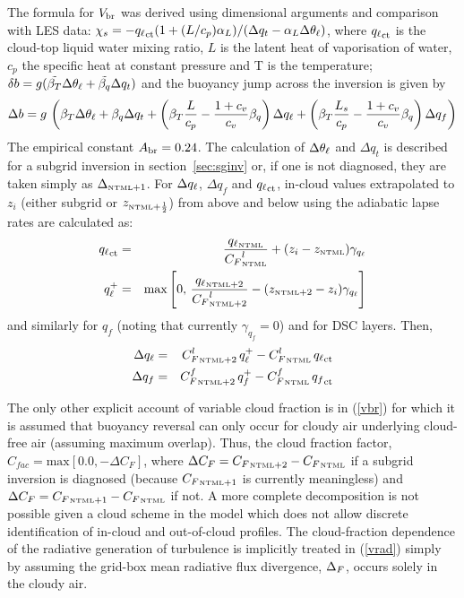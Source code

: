 \documentclass{UMDP_article}
\begin{document}
The formula for $V_{\rm br}$ was derived using dimensional arguments and
comparison with LES data: $\chi_s = -{q_{\ell}}_{\rm ct} (1+(L/c_p)\alpha_L) / (
\Delta q_t - \alpha_L \Delta \theta_{\ell})$, where ${q_{\ell}}_{\rm ct}$ is the
cloud-top liquid water mixing ratio, $L$ is the latent heat of
vaporisation of water, $c_p$ the specific heat at constant pressure
and T is the temperature; $\delta b = g(\tilde{\beta_T} \Delta \theta_{\ell}
+ \tilde{\beta_q} \Delta q_t)$ and the buoyancy jump across the
inversion is given by
\begin{equation}
  \Delta b = g \, \left( \beta_T \Delta \theta_{\ell} + \beta_q \Delta q_t +
    \left( \beta_T \frac{L}{c_p} - 
      \frac{1+c_v}{c_v}\beta_q \right)\Delta q_{\ell} + 
    \left( \beta_T \frac{L_s}{c_p} - 
      \frac{1+c_v}{c_v}\beta_q \right)\Delta q_f \right)
  \label{dbinv}
\end{equation}
The empirical constant $A_{\rm br} = 0.24$.  The calculation of $\Delta
\theta_{\ell}$ and $ \Delta q_t$ is described for a subgrid inversion in
section~\ref{sec:sginv} or, if one is not diagnosed, they are taken
simply as $\Delta_{\mbox{\tiny \rm NTML}+1}$.  For $\Delta q_{\ell}$, $\Delta q_f$ and
${q_{\ell}}_{\rm ct}$, in-cloud values extrapolated to $z_i$ (either subgrid or
$z_{\mbox{\tiny \rm NTML}+\frac{1}{2}}$) from above and below using the adiabatic
lapse rates are calculated as:
\begin{eqnarray*}
  {q_{\ell}}_{\rm ct} & =& \frac{{q_{\ell}}_{\mbox{\tiny \rm NTML}}}{{C_F}^l_{\mbox{\tiny \rm NTML}}} 
  + (z_i-z_{\mbox{\tiny \rm NTML}}) \gamma_{q_{\ell}}\\
  q_{\ell}^+  & =& \mbox{max}\left[ 0, \, 
    \frac{{q_{\ell}}_{\mbox{\tiny \rm NTML}+2}}{{C_F}^l_{\mbox{\tiny \rm NTML}+2}} 
    - (z_{\mbox{\tiny \rm NTML}+2}-z_i) \gamma_{q_{\ell}} \right]
\end{eqnarray*}
and similarly for $q_f$ (noting that currently $\gamma_{q_f}=0$) and
for DSC layers.  Then,
\begin{eqnarray*}
  \Delta q_{\ell} & =& {C_F^l}_{\mbox{\tiny \rm NTML}+2}\, q_{\ell}^+ - {C_F^l}_{\mbox{\tiny \rm NTML}}\, {q_{\ell}}_{\rm ct} \\
  \Delta q_f & =& {C_F^f}_{\mbox{\tiny \rm NTML}+2}\, q_f^+ - {C_F^f}_{\mbox{\tiny \rm NTML}}\, {q_f}_{\rm ct}
\end{eqnarray*}

The only other explicit account of variable cloud fraction is in
(\ref{vbr}) for which it is assumed that buoyancy reversal can only
occur for cloudy air underlying cloud-free air (assuming maximum
overlap).  Thus, the cloud fraction factor, $C_{fac} = \mbox{max}[
0.0, -\Delta C_F ] $, where $\Delta C_F = {C_F}_{\mbox{\tiny \rm NTML}+2} -
{C_F}_{\mbox{\tiny \rm NTML}} $ if a subgrid inversion is diagnosed (because
${C_F}_{\mbox{\tiny \rm NTML}+1}$ is currently meaningless) and $\Delta C_F =
{C_F}_{\mbox{\tiny \rm NTML}+1} - {C_F}_{\mbox{\tiny \rm NTML}} $ if not.  A more complete
decomposition is not possible given a cloud scheme in the model
\cite[]{smith90} which does not allow discrete identification of
in-cloud and out-of-cloud profiles.  The cloud-fraction dependence of
the radiative generation of turbulence is implicitly treated in
(\ref{vrad}) simply by assuming the grid-box mean radiative flux
divergence, $\Delta_F$, occurs solely in the cloudy air.
\end{document}
